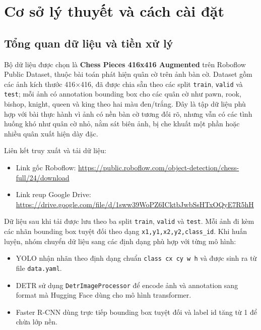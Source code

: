 \documentclass[12pt,a4paper]{article}
\begin{document}
\section{Cơ sở lý thuyết và cách cài đặt}

\subsection{Tổng quan dữ liệu và tiền xử lý}

Bộ dữ liệu được chọn là \textbf{Chess Pieces 416x416 Augmented} trên Roboflow Public Dataset, thuộc bài toán phát hiện quân cờ trên ảnh bàn cờ. Dataset gồm các ảnh kích thước 416$\times$416, đã được chia sẵn theo các split \texttt{train}, \texttt{valid} và \texttt{test}; mỗi ảnh có annotation bounding box cho các quân cờ như pawn, rook, bishop, knight, queen và king theo hai màu đen/trắng. Đây là tập dữ liệu phù hợp với bài thực hành vì ảnh có nền bàn cờ tương đối rõ, nhưng vẫn có các tình huống khó như quân cờ nhỏ, nằm sát biên ảnh, bị che khuất một phần hoặc nhiều quân xuất hiện dày đặc.

Liên kết truy xuất và tải dữ liệu:
\begin{itemize}[leftmargin=1.2cm]
    \item Link gốc Roboflow: \href{https://public.roboflow.com/object-detection/chess-full/24/download}{https://public.roboflow.com/object-detection/chess-full/24/download}
    \item Link reup Google Drive: \href{https://drive.google.com/file/d/1sww39WoPZ6ICktbJwbSsHTxOQyE7R5hH/view?usp=sharing}{https://drive.google.com/file/d/1sww39WoPZ6ICktbJwbSsHTxOQyE7R5hH}
\end{itemize}

Dữ liệu sau khi tải được lưu theo ba split \texttt{train}, \texttt{valid} và \texttt{test}. Mỗi ảnh đi kèm các nhãn bounding box tuyệt đối theo dạng \texttt{x1,y1,x2,y2,class\_id}. Khi huấn luyện, nhóm chuyển dữ liệu sang các định dạng phù hợp với từng mô hình:
\begin{itemize}[leftmargin=1.2cm]
    \item YOLO nhận nhãn theo định dạng chuẩn \texttt{class cx cy w h} và được sinh ra từ file \texttt{data.yaml}.
    \item DETR sử dụng \texttt{DetrImageProcessor} để encode ảnh và annotation sang format mà Hugging Face dùng cho mô hình transformer.
    \item Faster R-CNN dùng trực tiếp bounding box tuyệt đối và label id tăng từ 1 để chừa lớp nền.
\end{itemize}
\end{document}
